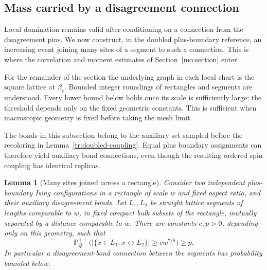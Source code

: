 \documentclass[11pt]{article}
\newtheorem{lemma}[theorem]{Lemma}
\theoremstyle{definition}
\theoremstyle{remark}
\numberwithin{equation}{section}
\begin{document}
\subsection{Mass carried by a disagreement connection}
\label{tr:mass-subsection}

Local domination remains valid after conditioning on a connection from
the disagreement pins. We now construct, in the doubled plus-boundary
reference, an increasing event joining many sites of a segment to such
a connection. This is where the correlation and moment estimates of
Section~\ref{mo:section} enter.

For the remainder of the section the underlying graph in each local
chart is the square lattice at $\beta_c$. Bounded integer roundings of
rectangles and segments are understood. Every lower bound below holds
once its scale is sufficiently large; the threshold depends only on the
fixed geometric constants. This is sufficient when macroscopic geometry
is fixed before taking the mesh limit.

The bonds in this subsection belong to the auxiliary set sampled before
the recoloring in Lemma~\ref{tr:doubled-coupling}. Equal plus boundary
assignments can therefore yield auxiliary bond connections, even though
the resulting ordered spin coupling has identical replicas.

\begin{lemma}[Many sites joined across a rectangle]
\label{tr:many-sites}
Consider two independent plus-boundary Ising configurations in a rectangle
of scale $w$ and fixed aspect ratio, and their auxiliary disagreement
bonds. Let $L_1,L_2$ be straight lattice segments of lengths comparable to
$w$, in fixed compact bulk subsets of the rectangle, mutually separated
by a distance comparable to $w$. There are constants $c,p>0$, depending
only on this geometry, such that
\begin{equation}
\label{tr:many-sites-eq}
 \mathbb P_Q^{++}\bigl(
 |\{x\in L_1:x\longleftrightarrow L_2\}|\geq c w^{7/8}
 \bigr)\geq p.
\end{equation}
In particular a disagreement-bond connection between the segments has
probability bounded below.
\end{lemma}
\end{document}
